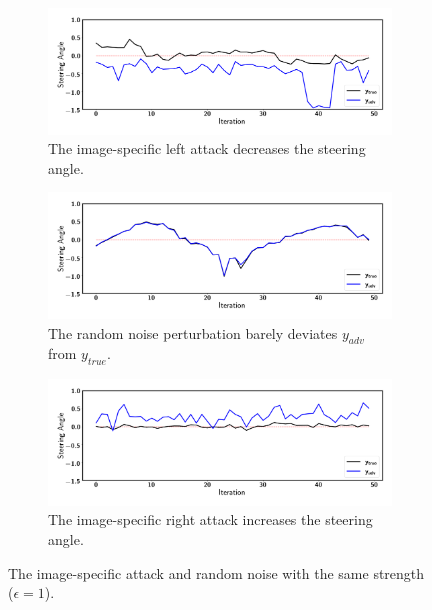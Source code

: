 \begin{figure}[tbph]
    \centering
    \begin{subfigure}[b]{\textwidth}
        \centering
        \includegraphics[width=\textwidth]{figures/chapter_driving/left.png}
        \caption{The image-specific left attack decreases the steering angle.\label{fig:image-specific-left-attack}}
    \end{subfigure}
    \begin{subfigure}[b]{\textwidth}
        \centering
        \includegraphics[width=\textwidth]{figures/chapter_driving/random.png}
        \caption{The random noise perturbation barely deviates $y_{adv}$ from $y_{true}$.}
    \end{subfigure}
    \begin{subfigure}[b]{\textwidth}
        \centering
        \includegraphics[width=\textwidth]{figures/chapter_driving/right.png}
        \caption{The image-specific right attack increases the steering angle.\label{fig:image-specific-right-attack}}
    \end{subfigure}
    \caption{The image-specific attack and random noise with the same strength ($\epsilon = 1$).}
    \label{fig:image-specific-online}
\end{figure}

